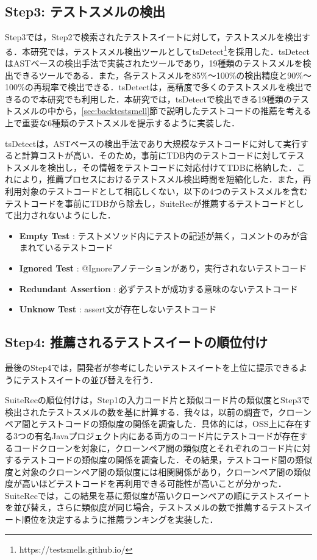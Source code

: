 \documentclass[12pt]{jarticle} %
\begin{document}
\subsection{Step3: テストスメルの検出}

Step3では，Step2で検索されたテストスイートに対して，テストスメルを検出する．本研究では，テストスメル検出ツールとして{\sf tsDetect}\footnote{https://testsmells.github.io/}\cite{Peruma}を採用した．{\sf tsDetect}はASTベースの検出手法で実装されたツールであり，19種類のテストスメルを検出できるツールである．また，各テストスメルを85\%〜100\%の検出精度と90\%〜100\%の再現率で検出できる．{\sf tsDetect}は，高精度で多くのテストスメルを検出できるので本研究でも利用した．本研究では，{\sf tsDetect}で検出できる19種類のテストスメルの中から，\ref{sec:backtestsmell}節で説明したテストコードの推薦を考える上で重要な6種類のテストスメルを提示するように実装した．

{\sf tsDetect}は，ASTベースの検出手法であり大規模なテストコードに対して実行すると計算コストが高い．そのため，事前にTDB内のテストコードに対してテストスメルを検出し，その情報をテストコードに対応付けてTDBに格納した．これにより，推薦プロセスにおけるテストスメル検出時間を短縮化した．また，再利用対象のテストコードとして相応しくない，以下の4つのテストスメルを含むテストコードを事前にTDBから除去し，{\sf SuiteRec}が推薦するテストコードとして出力されないようにした．

\begin{itemize}
\item \textbf{Empty Test} : テストメソッド内にテストの記述が無く，コメントのみが含まれているテストコード
\item \textbf{Ignored Test} : @Ignoreアノテーションがあり，実行されないテストコード
\item \textbf{Redundant Assertion} : 必ずテストが成功する意味のないテストコード
\item \textbf{Unknow Test} : assert文が存在しないテストコード
\end{itemize}

\subsection{Step4: 推薦されるテストスイートの順位付け}

最後のStep4では，開発者が参考にしたいテストスイートを上位に提示できるようにテストスイートの並び替えを行う．

{\sf SuiteRec}の順位付けは，Step1の入力コード片と類似コード片の類似度とStep3で検出されたテストスメルの数を基に計算する．我々は，以前の調査\cite{fose2019}で，クローンペア間とテストコードの類似度の関係を調査した．具体的には，OSS上に存在する3つの有名Javaプロジェクト内にある両方のコード片にテストコードが存在するコードクローンを対象に，クローンペア間の類似度とそれぞれのコード片に対するテストコードの類似度の関係を調査した．その結果，テストコード間の類似度と対象のクローンペア間の類似度には相関関係があり，クローンペア間の類似度が高いほどテストコードを再利用できる可能性が高いことが分かった．{\sf SuiteRec}では，この結果を基に類似度が高いクローンペアの順にテストスイートを並び替え，さらに類似度が同じ場合，テストスメルの数で推薦するテストスイート順位を決定するように推薦ランキングを実装した．
\end{document}
